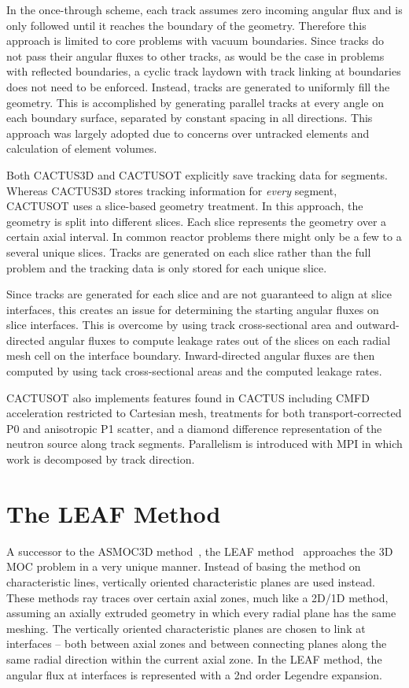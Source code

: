 In the once-through scheme, each track assumes zero incoming angular flux and is only followed until it reaches the boundary of the geometry. Therefore this approach is limited to core problems with vacuum boundaries. Since tracks do not pass their angular fluxes to other tracks, as would be the case in problems with reflected boundaries, a cyclic track laydown with track linking at boundaries does not need to be enforced. Instead, tracks are generated to uniformly fill the geometry. This is accomplished by generating parallel tracks at every angle on each boundary surface, separated by constant spacing in all directions. This approach was largely adopted due to concerns over untracked elements and calculation of element volumes.

Both CACTUS3D and CACTUSOT explicitly save tracking data for segments. Whereas CACTUS3D stores tracking information for \textit{every} segment, CACTUSOT uses a slice-based geometry treatment. In this approach, the geometry is split into different slices. Each slice represents the geometry over a certain axial interval. In common reactor problems there might only be a few to a several unique slices. Tracks are generated on each slice rather than the full problem and the tracking data is only stored for each unique slice. 

Since tracks are generated for each slice and are not guaranteed to align at slice interfaces, this creates an issue for determining the starting angular fluxes on slice interfaces. This is overcome by using track cross-sectional area and outward-directed angular fluxes to compute leakage rates out of the slices on each radial mesh cell on the interface boundary. Inward-directed angular fluxes are then computed by using tack cross-sectional areas and the computed leakage rates.

CACTUSOT also implements features found in CACTUS including \ac{CMFD} acceleration restricted to Cartesian mesh, treatments for both transport-corrected P0 and anisotropic P1 scatter, and a diamond difference representation of the neutron source along track segments. Parallelism is introduced with \ac{MPI} in which work is decomposed by track direction.


\section{The LEAF Method}
\label{sec:leaf}

A successor to the ASMOC3D method~\cite{pre_leaf}, the LEAF method~\cite{leaf_init, leaf_method} approaches the 3D \ac{MOC} problem in a very unique manner. Instead of basing the method on characteristic lines, vertically oriented characteristic planes are used instead. These methods ray traces over certain axial zones, much like a 2D/1D method, assuming an axially extruded geometry in which every radial plane has the same meshing. The vertically oriented characteristic planes are chosen to link at interfaces -- both between axial zones and between connecting planes along the same radial direction within the current axial zone. In the LEAF method, the angular flux at interfaces is represented with a 2nd order Legendre expansion.

